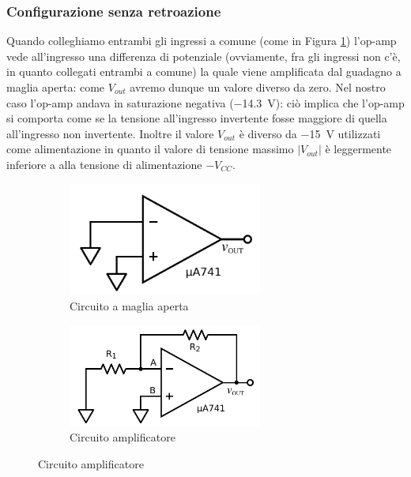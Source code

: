 \subsubsection{Configurazione senza retroazione}

Quando colleghiamo entrambi gli ingressi a comune (come in Figura \ref{cir:open_loop}) l'op-amp vede all'ingresso una differenza di potenziale (ovviamente, fra gli ingressi non c'è, in quanto collegati entrambi a comune) la quale viene amplificata dal guadagno a maglia aperta: come $V_{out}$ avremo dunque un valore diverso da zero. Nel nostro caso l'op-amp andava in saturazione negativa (\SI{-14.3}{\volt}): ciò implica che l'op-amp si comporta come se la tensione all'ingresso invertente fosse maggiore di quella all'ingresso non invertente. Inoltre il valore $V_{out}$ è diverso da \SI{-15}{\volt} utilizzati come alimentazione in quanto il valore di tensione massimo $|V_{out}|$ è leggermente inferiore a alla tensione di alimentazione $-V_{CC}$.

\begin{figure}[ht]
        \centering
        \begin{subfigure}[b]{0.35\textwidth}
                 \includegraphics[width=0.70\textwidth]{../E02/latex/open_loop.pdf}
                \caption{Circuito a maglia aperta}
                \label{cir:open_loop}
        \end{subfigure}%
    \quad
        \begin{subfigure}[b]{0.35\textwidth}
               \includegraphics[width=0.70\textwidth]{../E02/latex/inv.pdf}
                \caption{Circuito amplificatore}
                \label{cir:inv}
        \end{subfigure}
     
\end{figure}

